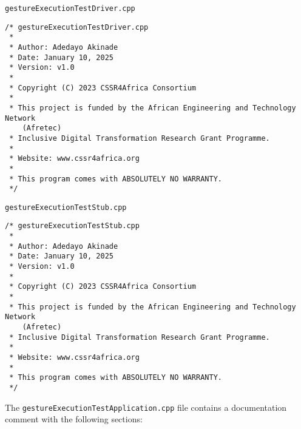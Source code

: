 \documentclass{CSSRforAfrica}
\newcommand{\blank}{~\\}
\newcommand{\checkboxChecked}{\fbox{\ding{51}}} %
\begin{document}
\begin{description}
\newpage
\item[\checkboxChecked] {\small \verb+gestureExecutionTestDriver.cpp+}  
{\small \begin{verbatim}
/* gestureExecutionTestDriver.cpp
 *
 * Author: Adedayo Akinade
 * Date: January 10, 2025
 * Version: v1.0
 * 
 * Copyright (C) 2023 CSSR4Africa Consortium
 * 
 * This project is funded by the African Engineering and Technology Network
    (Afretec) 
 * Inclusive Digital Transformation Research Grant Programme. 
 *
 * Website: www.cssr4africa.org
 *
 * This program comes with ABSOLUTELY NO WARRANTY.
 */
\end{verbatim} }

\item[\checkboxChecked]  {\small \verb+gestureExecutionTestStub.cpp+}  
{\small \begin{verbatim}
/* gestureExecutionTestStub.cpp
 *
 * Author: Adedayo Akinade
 * Date: January 10, 2025
 * Version: v1.0
 * 
 * Copyright (C) 2023 CSSR4Africa Consortium
 * 
 * This project is funded by the African Engineering and Technology Network
    (Afretec) 
 * Inclusive Digital Transformation Research Grant Programme. 
 *
 * Website: www.cssr4africa.org
 *
 * This program comes with ABSOLUTELY NO WARRANTY.
 */
\end{verbatim} }

\end{description} 
%
\noindent The {\small \verb+gestureExecutionTestApplication.cpp+} file contains a documentation comment with the following sections:
\end{document}
